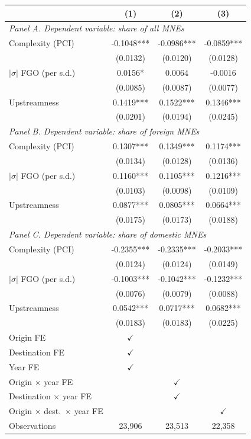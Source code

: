 \begin{tabular}{lccc} \hline
 & (1) & (2) & (3) \\ \hline
\multicolumn{4}{l}{\textit{Panel A. Dependent variable: share of all MNEs}} \\
Complexity (PCI) & -0.1048*** & -0.0986*** & -0.0859*** \\
 & (0.0132) & (0.0120) & (0.0128) \\
$|\sigma|$ FGO (per s.d.) & 0.0156* & 0.0064 & -0.0016 \\
 & (0.0085) & (0.0087) & (0.0077) \\
Upstreamness & 0.1419*** & 0.1522*** & 0.1346*** \\
 & (0.0201) & (0.0194) & (0.0245) \\
\midrule
\multicolumn{4}{l}{\textit{Panel B. Dependent variable: share of foreign MNEs}} \\
Complexity (PCI) & 0.1307*** & 0.1349*** & 0.1174*** \\
 & (0.0134) & (0.0128) & (0.0136) \\
$|\sigma|$ FGO (per s.d.) & 0.1160*** & 0.1105*** & 0.1216*** \\
 & (0.0103) & (0.0098) & (0.0109) \\
Upstreamness & 0.0877*** & 0.0805*** & 0.0664*** \\
 & (0.0175) & (0.0173) & (0.0188) \\
\midrule
\multicolumn{4}{l}{\textit{Panel C. Dependent variable: share of domestic MNEs}} \\
Complexity (PCI) & -0.2355*** & -0.2335*** & -0.2033*** \\
 & (0.0124) & (0.0124) & (0.0149) \\
$|\sigma|$ FGO (per s.d.) & -0.1003*** & -0.1042*** & -0.1232*** \\
 & (0.0076) & (0.0079) & (0.0088) \\
Upstreamness & 0.0542*** & 0.0717*** & 0.0682*** \\
 & (0.0183) & (0.0183) & (0.0225) \\
\hline
Origin FE & $\checkmark$ &  &  \\
Destination FE & $\checkmark$ &  &  \\
Year FE & $\checkmark$ &  &  \\
Origin $\times$ year FE &  & $\checkmark$ &  \\
Destination $\times$ year FE &  & $\checkmark$ &  \\
Origin $\times$ dest.\ $\times$ year FE &  &  & $\checkmark$ \\
Observations & 23,906 & 23,513 & 22,358 \\
\hline
\end{tabular}
